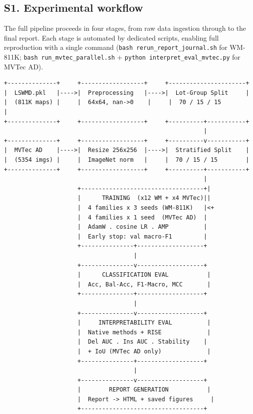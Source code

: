 \documentclass[11pt,a4paper]{article}
\begin{document}
\subsection*{S1. Experimental workflow}

The full pipeline proceeds in four stages, from raw data ingestion through to the final report. Each stage is automated by dedicated scripts, enabling full reproduction with a single command (\texttt{bash rerun\_report\_journal.sh} for WM-811K; \texttt{bash run\_mvtec\_parallel.sh} + \texttt{python interpret\_eval\_mvtec.py} for MVTec AD).

\begin{Verbatim}
+--------------+     +------------------+     +----------------------+
|  LSWMD.pkl   |---->|  Preprocessing   |---->|  Lot-Group Split     |
|  (811K maps) |     |  64x64, nan->0    |     |  70 / 15 / 15        |
+--------------+     +------------------+     +----------+-----------+
                                                         |
+--------------+     +------------------+     +----------v-----------+
|  MVTec AD    |---->|  Resize 256x256  |---->|  Stratified Split    |
|  (5354 imgs) |     |  ImageNet norm   |     |  70 / 15 / 15        |
+--------------+     +------------------+     +----------+-----------+
                                                         |
                     +-----------------------------------+|
                     |      TRAINING  (x12 WM + x4 MVTec)||
                     |  4 families x 3 seeds (WM-811K)   |<+
                     |  4 families x 1 seed  (MVTec AD)  |
                     |  AdamW . cosine LR . AMP          |
                     |  Early stop: val macro-F1         |
                     +---------------+-------------------+
                                     |
                     +---------------v-------------------+
                     |      CLASSIFICATION EVAL           |
                     |  Acc, Bal-Acc, F1-Macro, MCC       |
                     +---------------+-------------------+
                                     |
                     +---------------v-------------------+
                     |     INTERPRETABILITY EVAL          |
                     |  Native methods + RISE             |
                     |  Del AUC . Ins AUC . Stability    |
                     |  + IoU (MVTec AD only)             |
                     +---------------+-------------------+
                                     |
                     +---------------v-------------------+
                     |        REPORT GENERATION           |
                     |  Report -> HTML + saved figures     |
                     +-----------------------------------+
\end{Verbatim}
\end{document}
